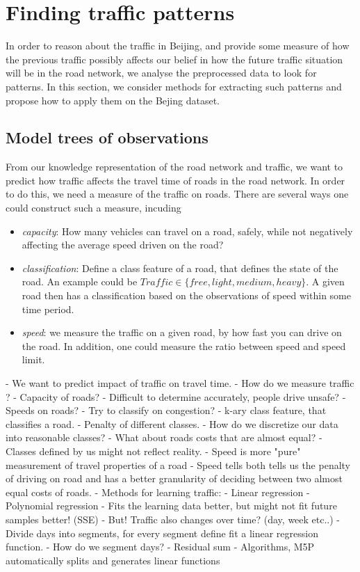 \section{Finding traffic patterns}
In order to reason about the traffic in Beijing, and provide some measure of how the previous traffic possibly affects our belief in how the future traffic situation will be in the road network, we analyse the preprocessed data to look for patterns. In this section, we consider methods for extracting such patterns and propose how to apply them on the Bejing dataset.


\subsection{Model trees of observations}\label{patterns:model-trees}
From our knowledge representation of the road network and traffic, we want to predict how traffic affects the travel time of roads in the road network. In order to do this, we need a measure of the traffic on roads. There are several ways one could construct such a measure, incuding
\begin{itemize}
\item \emph{capacity}: How many vehicles can travel on a road, safely, while not negatively affecting the average speed driven on the road?
\item \emph{classification}: Define a class feature of a road, that defines the state of the road. An example could be $Traffic \in \{free, light, medium, heavy\}$. A given road then has a classification based on the observations of speed within some time period.
\item \emph{speed}: we measure the traffic on a given road, by how fast you can drive on the road. In addition, one could measure the ratio between speed and speed limit.
\end{itemize}

 - We want to predict impact of traffic on travel time.
 - How do we measure traffic ? 
 	-	Capacity of roads?
 		- Difficult to determine accurately, people drive unsafe?
 	- 	Speeds on roads?
 	-	Try to classify on congestion?
 		- k-ary class feature, that classifies a road.
 		- Penalty of different classes.
 		- How do we discretize our data into reasonable classes?
 		- What about roads costs that are almost equal?
 		- Classes defined by us might not reflect reality.
 	-	Speed is more "pure" measurement of travel properties of a road
 		- Speed tells both tells us the penalty of driving on road and has a better granularity of deciding between two almost equal costs of roads.
 		- Methods for learning traffic:
 			-	Linear regression
 			-	Polynomial regression
 				- Fits the learning data better, but might not fit future samples better! (SSE)
 			-	But! Traffic also changes over time? (day, week etc..)
 			-	Divide days into segments, for every segment define fit a linear regression function.
 			-	How do we segment days?
 			-	Residual sum
 			-	Algorithms, M5P automatically splits and generates linear functions
 
